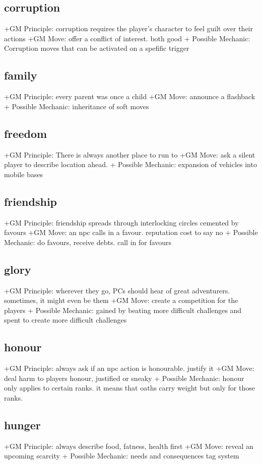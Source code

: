 \documentclass{tufte-handout}
\begin{document}
\begin{multicols}{2}
\subsection{corruption}
+GM Principle: corruption requires the player's character to feel guilt over their actions	
+GM Move:  offer a conflict of interest. both good	
+ Possible Mechanic: Corruption moves that can be activated on a spefific trigger

\subsection{family}
+GM Principle: every parent was once a child
+GM Move: 	announce a flashback
+ Possible Mechanic: 	inheritance of soft moves

\subsection{freedom}
+GM Principle:  There is always another place to run to
+GM Move:  ask a silent player to describe location ahead.
+ Possible Mechanic: expansion of vehicles into mobile bases 

\subsection{friendship}
+GM Principle: friendship spreads through interlocking circles cemented by favours
+GM Move: an npc calls in a favour. reputation cost to say no 
+ Possible Mechanic: do favours, receive debts. call in for favours
		
\subsection{glory}
+GM Principle: wherever they go, PCs should hear of great adventurers. sometimes, it might even be them
+GM Move: create a competition for the players
+ Possible Mechanic: gained by beating more difficult challenges and spent to create more difficult challenges  

\subsection{honour}
+GM Principle: always ask if an npc action is honourable. justify it
+GM Move: deal harm to players honour, justified or sneaky
+ Possible Mechanic: honour only applies to certain ranks. it means that oaths carry weight but only for those ranks.

\subsection{hunger}
+GM Principle:  always describe food, fatness, health first
+GM Move:   reveal an upcoming scarcity
+ Possible Mechanic: needs and consequences tag system


\end{multicols}
\end{document}
